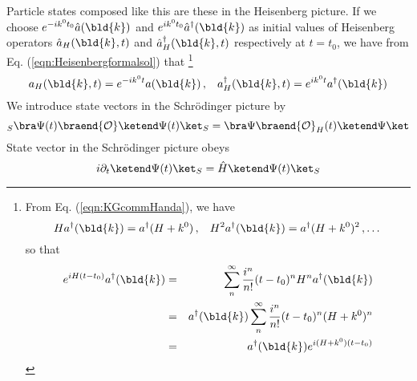 Particle states composed like this are these in the Heisenberg picture.
If we choose $e^{-i k^0 t_0} \hat{a}(\bld{k})$ and $e^{i k^0 t_0} \hat{a}^\dagger(\bld{k})$
as initial values of Heisenberg operators $\hat{a}_H(\bld{k}, t)$ and $\hat{a}_H^\dagger(\bld{k}, t)$
respectively at $t = t_0$, we have from Eq. (\ref{eqn:Heisenbergformalsol}) that
\footnote{%
From Eq. (\ref{eqn:KGcommHanda}), we have
\begin{equation*}
H a^\dagger (\bld{k}) = a^\dagger (H + k^0)
\,,\hspace{3mm}
H^2 a^\dagger (\bld{k}) = a^\dagger (H + k^0)^2\,,\dots
\end{equation*}
so that
\begin{eqnarray*}
e^{i H (t-t_0)} a^\dagger (\bld{k})
&=&
\sum_n^\infty \frac{i^n}{n!} (t-t_0)^n H^n a^\dagger (\bld{k})
\\
&=&
a^\dagger (\bld{k}) \sum_n^\infty \frac{i^n}{n!} (t-t_0)^n (H + k^0)^n 
\\
&=&
a^\dagger (\bld{k})  e^{i (H + k^0) (t-t_0)}
\end{eqnarray*}
} %
\begin{equation}
a_H(\bld{k}, t) = e^{-i k^0 t} a (\bld{k})\,,
\hspace{3mm}
a_H^\dagger(\bld{k}, t) = e^{i k^0 t} a^\dagger (\bld{k})
\end{equation}
We introduce state vectors in the Schr\"odinger picture by
\begin{equation}
{}_S\bra \Psi(t) \braend {\cal O} \ketend \Psi(t) \ket_S
=
\bra \Psi \braend {\cal O}_H(t) \ketend \Psi \ket
\end{equation}
State vector in the Schr\"odinger picture obeys 
\begin{equation}
i \partial_t \ketend \Psi(t) \ket_S = \hat{H} \ketend \Psi(t) \ket_S
\end{equation}

\newpage
